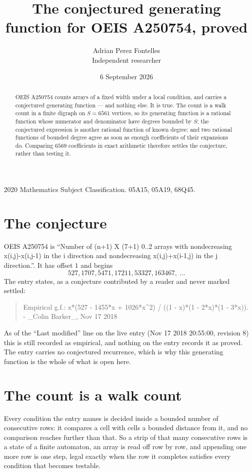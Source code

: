 \documentclass[11pt,a4paper]{article}
\title{The conjectured generating function for OEIS A250754, proved}
\author{Adrian Perez Fontelles\\ \small Independent researcher}
\date{6 September 2026}
\theoremstyle{plain}
\theoremstyle{definition}
\begin{document}
\maketitle

\begin{abstract}
OEIS A250754 counts arrays of a fixed width under a local condition, and carries a conjectured
generating function --- and nothing else. It is true. The count is a walk count in a finite
digraph on $S=6561$ vertices, so its generating function is a rational function whose numerator
and denominator have degrees bounded by $S$; the conjectured expression is another rational
function of known degree; and two rational functions of bounded degree agree as soon as enough
coefficients of their expansions do. Comparing $6569$ coefficients in exact arithmetic
therefore settles the conjecture, rather than testing it.
\end{abstract}

\noindent\small 2020 Mathematics Subject Classification. 05A15, 05A19, 68Q45.\normalsize

\section{The conjecture}

OEIS A250754 is ``Number of (n+1) X (7+1) 0..2 arrays with nondecreasing x(i,j)-x(i,j-1) in the i direction and nondecreasing x(i,j)+x(i-1,j) in the j direction.''. It has offset $1$ and begins
\[
527, 1707, 5471, 17211, 53327, 163467,\ \dots
\]
The entry states, as a conjecture contributed by a reader and never marked settled:
\begin{quote}
Empirical g.f.: x*(527 - 1455*x + 1026*x\^{}2) / ((1 - x)*(1 - 2*x)*(1 - 3*x)). - \_Colin Barker\_, Nov 17 2018
\end{quote}
As of the ``Last modified'' line on the live entry (Nov 17 2018 20:55:00, revision 8) this is still
recorded as empirical, and nothing on the entry records it as proved. The entry carries no
conjectured recurrence, which is why this generating function is the whole of what is open
here.

\section{The count is a walk count}

Every condition the entry names is decided inside a bounded number of consecutive rows: it
compares a cell with cells a bounded distance from it, and no comparison reaches further than
that. So a strip of that many consecutive rows is a state of a finite automaton, an array is
read off row by row, and appending one more row is one step, legal exactly when the row it
completes satisfies every condition that becomes testable.
\end{document}
